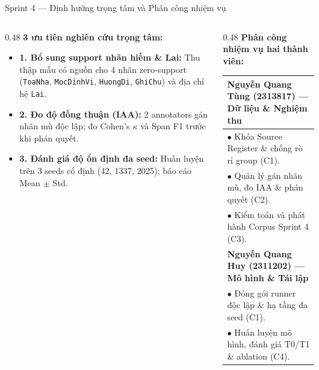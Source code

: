 \documentclass[aspectratio=169, 9pt]{beamer}
\begin{document}
\begin{frame}{Sprint 4 — Định hướng trọng tâm và Phân công nhiệm vụ}
  \vspace{-0.15cm}
  \begin{columns}[T]
    \begin{column}{0.48\textwidth}
      \textbf{3 ưu tiên nghiên cứu trọng tâm:}
      \vspace{0.05cm}
      {\fontsize{7.8pt}{9.8pt}\selectfont
      \begin{itemize}
        \setlength{\itemsep}{3pt}
        \item \textbf{1. Bổ sung support nhãn hiếm \& Lai:} Thu thập mẫu có nguồn cho 4 nhãn zero-support (\texttt{ToaNha}, \texttt{MocDinhVi}, \texttt{HuongDi}, \texttt{GhiChu}) và địa chỉ hệ \texttt{Lai}.
        \item \textbf{2. Đo độ đồng thuận (IAA):} 2 annotators gán nhãn mù độc lập; đo Cohen's $\kappa$ và Span F1 trước khi phán quyết.
        \item \textbf{3. Đánh giá độ ổn định đa seed:} Huấn luyện trên 3 seeds cố định (42, 1337, 2025); báo cáo Mean $\pm$ Std.
      \end{itemize}
      }
    \end{column}
    \begin{column}{0.48\textwidth}
      \textbf{Phân công nhiệm vụ hai thành viên:}
      \vspace{0.05cm}
      {\fontsize{7.2pt}{9pt}\selectfont
      \begin{tabularx}{\linewidth}{>{\raggedright\arraybackslash}X}
        \rowcolor{tableheader}
        \textbf{Nguyễn Quang Tùng (2313817) --- Dữ liệu \& Nghiệm thu} \\
        \midrule
        $\bullet$ Khóa Source Register \& chống rò rỉ group (C1). \\
        $\bullet$ Quản lý gán nhãn mù, đo IAA \& phán quyết (C2). \\
        $\bullet$ Kiểm toán và phát hành Corpus Sprint 4 (C3). \\
        \midrule
        \rowcolor{tableheader}
        \textbf{Nguyễn Quang Huy (2311202) --- Mô hình \& Tái lập} \\
        \midrule
        $\bullet$ Đóng gói runner độc lập \& hạ tầng đa seed (C1). \\
        $\bullet$ Huấn luyện mô hình, đánh giá T0/T1 \& ablation (C4). \\

\end{tabularx}}
\end{column}
\end{columns}
\end{frame}
\end{document}
